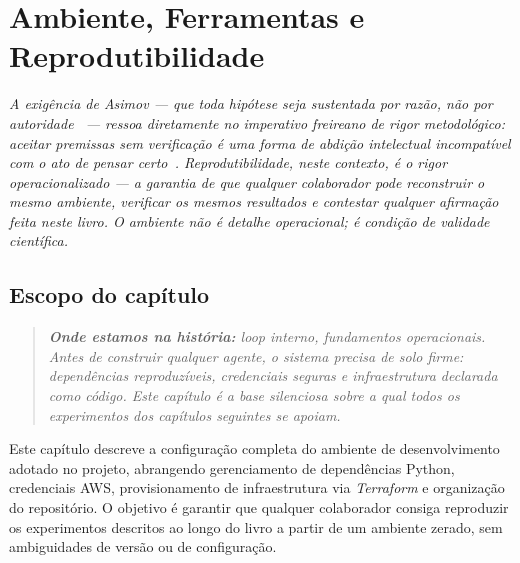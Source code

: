 \chapter{Ambiente, Ferramentas e Reprodutibilidade}
\label{chap:ambiente_reprodutibilidade}

{\small\itshape\color{AccentGray}
A exig\^{e}ncia de Asimov --- que toda hip\'{o}tese seja sustentada por raz\~{a}o, n\~{a}o por autoridade~\cite{asimov1950irobot} --- ressoa diretamente no imperativo freireano de \textit{rigor metodol\'{o}gico}: aceitar premissas sem verifica\c{c}\~{a}o \'{e} uma forma de abdi\c{c}\~{a}o intelectual incompat\'{i}vel com o ato de pensar certo~\cite{freire1996autonomia}. Reprodutibilidade, neste contexto, \'{e} o rigor operacionalizado --- a garantia de que qualquer colaborador pode reconstruir o mesmo ambiente, verificar os mesmos resultados e contestar qualquer afirma\c{c}\~{a}o feita neste livro. O ambiente n\~{a}o \'{e} detalhe operacional; \'{e} condi\c{c}\~{a}o de validade cient\'{i}fica.\par}
\vspace{0.6em}
\section{Escopo do cap\'itulo}

\begin{quote}\itshape
\textbf{Onde estamos na hist\'oria:} loop interno, fundamentos operacionais.
Antes de construir qualquer agente, o sistema precisa de solo firme:
depend\^encias reproduz\'iveis, credenciais seguras e infraestrutura
declarada como c\'odigo. Este cap\'itulo \'e a base silenciosa sobre a
qual todos os experimentos dos cap\'itulos seguintes se apoiam.
\end{quote}

Este cap\'itulo descreve a configura\c{c}\~ao completa do ambiente de
desenvolvimento adotado no projeto, abrangendo gerenciamento de
depend\^encias Python, credenciais AWS,
provisionamento de infraestrutura
via \textit{Terraform} e organiza\c{c}\~ao do reposit\'orio. O objetivo
\'e garantir que qualquer colaborador consiga reproduzir os experimentos
descritos ao longo do livro a partir de um ambiente zerado, sem
ambiguidades de vers\~ao ou de configura\c{c}\~ao.

